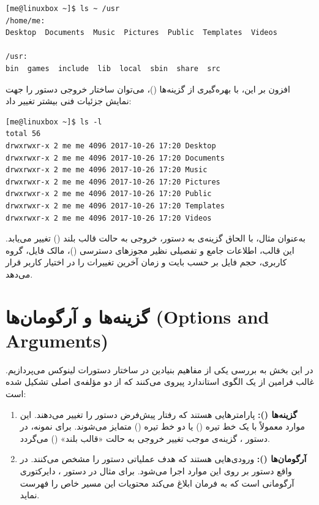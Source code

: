 \begin{latin}
\begin{lstlisting}
[me@linuxbox ~]$ ls ~ /usr
/home/me:
Desktop  Documents  Music  Pictures  Public  Templates  Videos

/usr:
bin  games  include  lib  local  sbin  share  src
\end{lstlisting}
\end{latin}

افزون بر این، با بهره‌گیری از گزینه‌ها ()، می‌توان ساختار خروجی دستور  را جهت نمایش جزئیات فنی بیشتر تغییر داد:

\begin{latin}
\begin{lstlisting}
[me@linuxbox ~]$ ls -l
total 56
drwxrwxr-x 2 me me 4096 2017-10-26 17:20 Desktop
drwxrwxr-x 2 me me 4096 2017-10-26 17:20 Documents
drwxrwxr-x 2 me me 4096 2017-10-26 17:20 Music
drwxrwxr-x 2 me me 4096 2017-10-26 17:20 Pictures
drwxrwxr-x 2 me me 4096 2017-10-26 17:20 Public
drwxrwxr-x 2 me me 4096 2017-10-26 17:20 Templates
drwxrwxr-x 2 me me 4096 2017-10-26 17:20 Videos
\end{lstlisting}
\end{latin}

به‌عنوان مثال، با الحاق گزینه‌ی  به دستور، خروجی به حالت قالب بلند () تغییر می‌یابد. این قالب، اطلاعات جامع و تفصیلی نظیر مجوزهای دسترسی ()، مالک فایل، گروه کاربری، حجم فایل بر حسب بایت و زمان آخرین تغییرات را در اختیار کاربر قرار می‌دهد.

\section{گزینه‌ها و آرگومان‌ها (Options and Arguments)}

در این بخش به بررسی یکی از مفاهیم بنیادین در ساختار دستورات لینوکس می‌پردازیم. غالب فرامین از یک الگوی استاندارد پیروی می‌کنند که از دو مؤلفه‌ی اصلی تشکیل شده است:

\begin{enumerate}
  \item \textbf{گزینه‌ها ():} پارامترهایی هستند که رفتار پیش‌فرض دستور را تغییر می‌دهند. این موارد معمولاً با یک خط تیره (\cmd{-}) یا دو خط تیره (\cmd{--}) متمایز می‌شوند. برای نمونه، در دستور ، گزینه‌ی  موجب تغییر خروجی به حالت «قالب بلند» () می‌گردد.

  \item \textbf{آرگومان‌ها ():} ورودی‌هایی هستند که هدف عملیاتی دستور را مشخص می‌کنند. در واقع دستور بر روی این موارد اجرا می‌شود. برای مثال در دستور ، دایرکتوری  آرگومانی است که به فرمان  ابلاغ می‌کند محتویات این مسیر خاص را فهرست نماید.
\end{enumerate}

